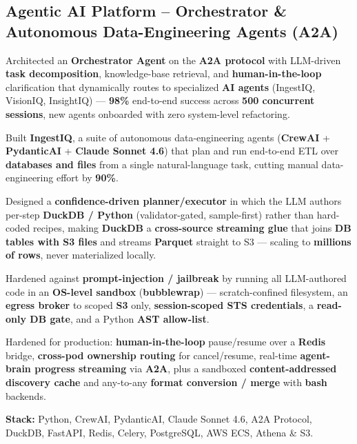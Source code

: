 \documentclass[letter,10pt]{article}
\begin{document}
\subsection{Agentic AI Platform -- Orchestrator \& Autonomous Data-Engineering Agents (A2A)}
\begin{zitemize}
\item Architected an \textbf{Orchestrator Agent} on the \textbf{A2A protocol} with LLM-driven \textbf{task decomposition}, knowledge-base retrieval, and \textbf{human-in-the-loop} clarification that dynamically routes to specialized \textbf{AI agents} (IngestIQ, VisionIQ, InsightIQ) --- \textbf{98\%} end-to-end success across \textbf{500 concurrent sessions}, new agents onboarded with zero system-level refactoring.
\item Built \textbf{IngestIQ}, a suite of autonomous data-engineering agents (\textbf{CrewAI} + \textbf{PydanticAI} + \textbf{Claude Sonnet 4.6}) that plan and run end-to-end ETL over \textbf{databases and files} from a single natural-language task, cutting manual data-engineering effort by \textbf{90\%}.
\item Designed a \textbf{confidence-driven planner/executor} in which the LLM authors per-step \textbf{DuckDB / Python} (validator-gated, sample-first) rather than hard-coded recipes, making \textbf{DuckDB} a \textbf{cross-source streaming glue} that joins \textbf{DB tables with S3 files} and streams \textbf{Parquet} straight to S3 --- scaling to \textbf{millions of rows}, never materialized locally.
\item Hardened against \textbf{prompt-injection / jailbreak} by running all LLM-authored code in an \textbf{OS-level sandbox} (\textbf{bubblewrap}) --- scratch-confined filesystem, an \textbf{egress broker} to scoped \textbf{S3} only, \textbf{session-scoped STS credentials}, a \textbf{read-only DB gate}, and a Python \textbf{AST allow-list}.
\item Hardened for production: \textbf{human-in-the-loop} pause/resume over a \textbf{Redis} bridge, \textbf{cross-pod ownership routing} for cancel/resume, real-time \textbf{agent-brain progress streaming} via \textbf{A2A}, plus a sandboxed \textbf{content-addressed discovery cache} and any-to-any \textbf{format conversion / merge} with \textbf{bash} backends.
\item \textbf{Stack:} Python, CrewAI, PydanticAI, Claude Sonnet 4.6, A2A Protocol, DuckDB, FastAPI, Redis, Celery, PostgreSQL, AWS ECS, Athena \& S3.
\end{zitemize}
\end{document}
